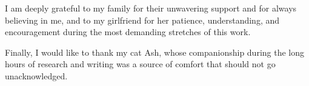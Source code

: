 \documentclass[12pt,MSc,wordcount,twoside,anon]{muthesis}
\theoremstyle{definition}
\theoremstyle{remark}
\begin{document}
I am deeply grateful to my family for their 
unwavering support and for always believing in me, 
and to my girlfriend for her patience, 
understanding, and encouragement during the most 
demanding stretches of this work.

Finally, I would like to thank my cat Ash, whose 
companionship during the long hours of research 
and writing was a source of comfort that should 
not go unacknowledged.

\afterpreface








\end{document}
